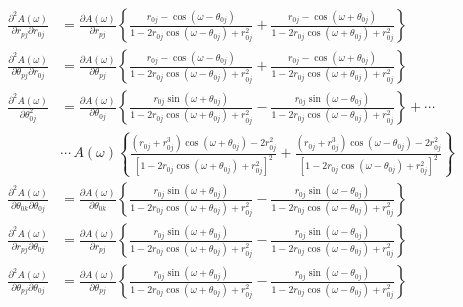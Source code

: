 \documentclass[a4paper,twoside,10pt,english]{report}
\begin{document}
\begin{raggedbottom}
\begin{align*}
\frac{\partial^{2}A\left(\omega\right)}{\partial r_{pj}\partial r_{0j}} &= \frac{\partial A\left(\omega\right)}{\partial r_{pj}}\left\{ \frac{r_{0j}-\cos\left(\omega-\theta_{0j}\right)}{1-2r_{0j}\cos\left(\omega-\theta_{0j}\right)+r_{0j}^{2}}+\frac{r_{0j}-\cos\left(\omega+\theta_{0j}\right)}{1-2r_{0j}\cos\left(\omega+\theta_{0j}\right)+r_{0j}^{2}}\right\} \\
\frac{\partial^{2}A\left(\omega\right)}{\partial\theta_{pj}\partial r_{0j}} &= \frac{\partial A\left(\omega\right)}{\partial\theta_{pj}}\left\{ \frac{r_{0j}-\cos\left(\omega-\theta_{0j}\right)}{1-2r_{0j}\cos\left(\omega-\theta_{0j}\right)+r_{0j}^{2}}+\frac{r_{0j}-\cos\left(\omega+\theta_{0j}\right)}{1-2r_{0j}\cos\left(\omega+\theta_{0j}\right)+r_{0j}^{2}}\right\} \\
\frac{\partial^{2}A\left(\omega\right)}{\partial\theta_{0j}^{2}} &= \frac{\partial A\left(\omega\right)}{\partial\theta_{0j}}\left\{ \frac{r_{0j}\sin\left(\omega+\theta_{0j}\right)}{1-2r_{0j}\cos\left(\omega+\theta_{0j}\right)+r_{0j}^{2}}-\frac{r_{0j}\sin\left(\omega-\theta_{0j}\right)}{1-2r_{0j}\cos\left(\omega-\theta_{0j}\right)+r_{0j}^{2}}\right\} +\cdots\\
 & \cdots\, A\left(\omega\right)\left\{ \frac{\left(r_{0j}+r_{0j}^{3}\right)\cos\left(\omega+\theta_{0j}\right)-2r_{0j}^{2}}{\left[1-2r_{0j}\cos\left(\omega+\theta_{0j}\right)+r_{0j}^{2}\right]^{2}}+\frac{\left(r_{0j}+r_{0j}^{3}\right)\cos\left(\omega-\theta_{0j}\right)-2r_{0j}^{2}}{\left[1-2r_{0j}\cos\left(\omega-\theta_{0j}\right)+r_{0j}^{2}\right]^{2}}\right\} \\
\frac{\partial^{2}A\left(\omega\right)}{\partial\theta_{0k}\partial\theta_{0j}} &= \frac{\partial A\left(\omega\right)}{\partial\theta_{0k}}\left\{ \frac{r_{0j}\sin\left(\omega+\theta_{0j}\right)}{1-2r_{0j}\cos\left(\omega+\theta_{0j}\right)+r_{0j}^{2}}-\frac{r_{0j}\sin\left(\omega-\theta_{0j}\right)}{1-2r_{0j}\cos\left(\omega-\theta_{0j}\right)+r_{0j}^{2}}\right\} \\
\frac{\partial^{2}A\left(\omega\right)}{\partial r_{pj}\partial\theta_{0j}} &= \frac{\partial A\left(\omega\right)}{\partial r_{pj}}\left\{ \frac{r_{0j}\sin\left(\omega+\theta_{0j}\right)}{1-2r_{0j}\cos\left(\omega+\theta_{0j}\right)+r_{0j}^{2}}-\frac{r_{0j}\sin\left(\omega-\theta_{0j}\right)}{1-2r_{0j}\cos\left(\omega-\theta_{0j}\right)+r_{0j}^{2}}\right\} \\
\frac{\partial^{2}A\left(\omega\right)}{\partial\theta_{pj}\partial\theta_{0j}} &= \frac{\partial A\left(\omega\right)}{\partial\theta_{pj}}\left\{ \frac{r_{0j}\sin\left(\omega+\theta_{0j}\right)}{1-2r_{0j}\cos\left(\omega+\theta_{0j}\right)+r_{0j}^{2}}-\frac{r_{0j}\sin\left(\omega-\theta_{0j}\right)}{1-2r_{0j}\cos\left(\omega-\theta_{0j}\right)+r_{0j}^{2}}\right\} 

\end{align*}
\end{raggedbottom}
\end{document}
